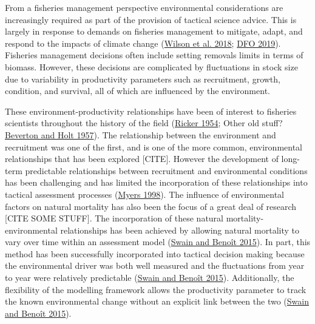 \documentclass[
]{article}
\begin{document}
From a fisheries management perspective environmental considerations are increasingly required as part of the provision of tactical science advice. This is largely in response to demands on fisheries management to mitigate, adapt, and respond to the impacts of climate change (\protect\hyperlink{ref-wilsonAdaptiveComanagementAchieve2018}{Wilson et al. 2018}; \protect\hyperlink{ref-dfoActAmendFisheries2019}{DFO 2019}). Fisheries management decisions often include setting removals limits in terms of biomass. However, these decisions are complicated by fluctuations in stock size due to variability in productivity parameters such as recruitment, growth, condition, and survival, all of which are influenced by the environment.

These environment-productivity relationships have been of interest to fisheries scientists throughout the history of the field (\protect\hyperlink{ref-rickerStockRecruitment1954}{Ricker 1954}; Other old stuff? \protect\hyperlink{ref-bevertonDynamicsExploitedFish1957}{Beverton and Holt 1957}). The relationship between the environment and recruitment was one of the first, and is one of the more common, environmental relationships that has been explored {[}CITE{]}. However the development of long-term predictable relationships between recruitment and environmental conditions has been challenging and has limited the incorporation of these relationships into tactical assessment processes (\protect\hyperlink{ref-myersWhenEnvironmentRecruitment1998}{Myers 1998}). The influence of environmental factors on natural mortality has also been the focus of a great deal of research {[}CITE SOME STUFF{]}. The incorporation of these natural mortality-environmental relationships has been achieved by allowing natural mortality to vary over time within an assessment model (\protect\hyperlink{ref-swainExtremeIncreasesNatural2015}{Swain and Benoît 2015}). In part, this method has been successfully incorporated into tactical decision making because the environmental driver was both well measured and the fluctuations from year to year were relatively predictable (\protect\hyperlink{ref-swainExtremeIncreasesNatural2015}{Swain and Benoît 2015}). Additionally, the flexibility of the modelling framework allows the productivity parameter to track the known environmental change without an explicit link between the two (\protect\hyperlink{ref-swainExtremeIncreasesNatural2015}{Swain and Benoît 2015}).
\end{document}
